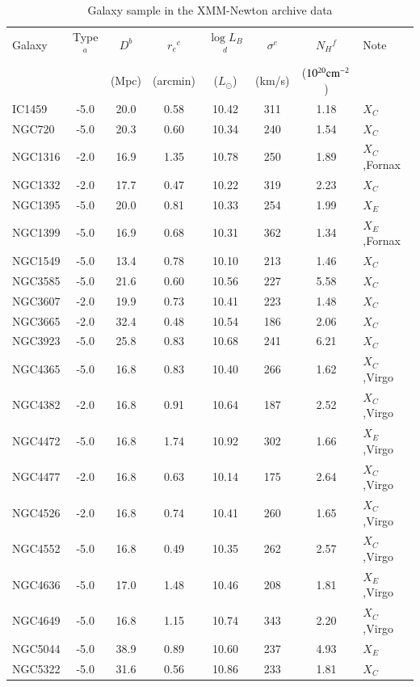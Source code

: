\documentclass[structabstract]{aa}
\begin{document}
\begin{table}
\caption{Galaxy sample in the XMM-Newton archive data}
\label{tab:tar_list}
\centering
\begin{tabular}{lccccccl}
\hline \hline
Galaxy & Type$^a$ & $D^b$ & $r_e$$^c$ & $\log L_B$$^d$ & $\sigma$$^e$ & $N_H$$^f$ & Note\\
 & & (Mpc) & (arcmin) & ($L_{\odot}$) & (km/s) & ($10^{20}{\rm cm}^{-2}$) & \\ \hline
IC1459 & -5.0 & 20.0 & 0.58 & 10.42 & 311 & 1.18 & $X_C$\\
NGC720 & -5.0 & 20.3 & 0.60 & 10.34 & 240 & 1.54 & $X_C$\\
NGC1316 & -2.0 & 16.9 & 1.35 & 10.78 & 250 & 1.89 & $X_C$,Fornax\\
NGC1332 & -2.0 & 17.7 & 0.47 & 10.22 & 319 & 2.23 & $X_C$\\
NGC1395 & -5.0 & 20.0 & 0.81 & 10.33 & 254 & 1.99 & $X_E$\\
NGC1399 & -5.0 & 16.9 & 0.68 & 10.31 & 362 & 1.34 & $X_E$,Fornax\\
NGC1549 & -5.0 & 13.4 & 0.78 & 10.10 & 213 & 1.46 & $X_C$\\
NGC3585 & -5.0 & 21.6 & 0.60 & 10.56 & 227 & 5.58 & $X_C$\\
NGC3607 & -2.0 & 19.9 & 0.73 & 10.41 & 223 & 1.48 & $X_C$\\
NGC3665 & -2.0 & 32.4 & 0.48 & 10.54 & 186 & 2.06 & $X_C$\\
NGC3923 & -5.0 & 25.8 & 0.83 & 10.68 & 241 & 6.21 & $X_C$\\
NGC4365 & -5.0 & 16.8 & 0.83 & 10.40 & 266 & 1.62 & $X_C$,Virgo\\
NGC4382 & -2.0 & 16.8 & 0.91 & 10.64 & 187 & 2.52 & $X_C$,Virgo\\
NGC4472 & -5.0 & 16.8 & 1.74 & 10.92 & 302 & 1.66 & $X_E$,Virgo\\
NGC4477 & -2.0 & 16.8 & 0.63 & 10.14 & 175 & 2.64 & $X_C$,Virgo\\
NGC4526 & -2.0 & 16.8 & 0.74 & 10.41 & 260 & 1.65 & $X_C$,Virgo\\
NGC4552 & -5.0 & 16.8 & 0.49 & 10.35 & 262 & 2.57 & $X_C$,Virgo\\
NGC4636 & -5.0 & 17.0 & 1.48 & 10.46 & 208 & 1.81 & $X_E$,Virgo\\
NGC4649 & -5.0 & 16.8 & 1.15 & 10.74 & 343 & 2.20 & $X_C$,Virgo\\
NGC5044 & -5.0 & 38.9 & 0.89 & 10.60 & 237 & 4.93 & $X_E$\\
NGC5322 & -5.0 & 31.6 & 0.56 & 10.86 & 233 & 1.81 & $X_C$\\

\end{tabular}
\end{table}
\end{document}

